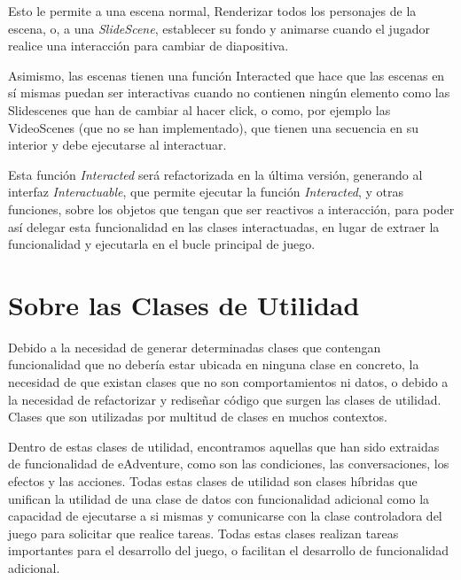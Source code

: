 Esto le permite a una escena normal, Renderizar todos los personajes de la escena, o, a una \textit{SlideScene}, establecer su fondo y animarse cuando el jugador realice una interacción para cambiar de diapositiva.

Asimismo, las escenas tienen una función Interacted que hace que las escenas en sí mismas puedan ser interactivas cuando no contienen ningún elemento como las Slidescenes que han de cambiar al hacer click, o como, por ejemplo las VideoScenes (que no se han implementado), que tienen una secuencia en su interior y debe ejecutarse al interactuar.

Esta función \textit{Interacted} será refactorizada en la última versión, generando al interfaz \textit{Interactuable}, que permite ejecutar la función \textit{Interacted}, y otras funciones, sobre los objetos que tengan que ser reactivos a interacción, para poder así delegar esta funcionalidad en las clases interactuadas, en lugar de extraer la funcionalidad y ejecutarla en el bucle principal de juego.

\section{Sobre las Clases de Utilidad}
\label{utilit1}

Debido a la necesidad de generar determinadas clases que contengan funcionalidad que no debería estar ubicada en ninguna clase en concreto, la necesidad de que existan clases que no son comportamientos ni datos, o debido a la necesidad de refactorizar y rediseñar código que surgen las clases de utilidad. Clases que son utilizadas por multitud de clases en muchos contextos.

Dentro de estas clases de utilidad, encontramos aquellas que han sido extraidas de funcionalidad de eAdventure, como son las condiciones, las conversaciones, los efectos y las acciones. Todas estas clases de utilidad son clases híbridas que unifican la utilidad de una clase de datos con funcionalidad adicional como la capacidad de ejecutarse a si mismas y comunicarse con la clase controladora del juego para solicitar que realice tareas. Todas estas clases realizan tareas importantes para el desarrollo del juego, o facilitan el desarrollo de funcionalidad adicional.

